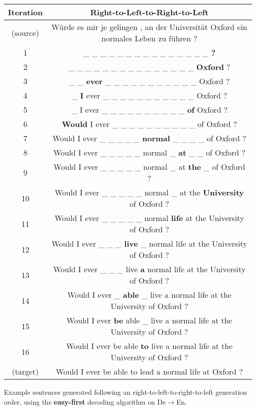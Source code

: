 \centering
\footnotesize
\begin{tabular}{cc}
\toprule
Iteration & {\color{orange} Right-to-Left-to-Right-to-Left} \\
\midrule
(source) & Würde es mir je gelingen , an der Universität Oxford ein normales Leben zu führen ? \\
1 &  \_ \_ \_ \_ \_ \_ \_ \_ \_ \_ \_ \_ \_ \_ \_ \textbf{?} \\ 
2 &  \_ \_ \_ \_ \_ \_ \_ \_ \_ \_ \_ \_ \_ \_ \_ \textbf{Oxford} ? \\ 
3 &  \_ \_ \textbf{ever} \_ \_ \_ \_ \_ \_ \_ \_ \_ \_ \_ Oxford ? \\ 
4 &  \_ \textbf{I} ever \_ \_ \_ \_ \_ \_ \_ \_ \_ \_ \_ Oxford ? \\ 
5 &  \_ I ever \_ \_ \_ \_ \_ \_ \_ \_ \_ \_ \textbf{of} Oxford ? \\ 
6 &  \textbf{Would} I ever \_ \_ \_ \_ \_ \_ \_ \_ \_ \_ of Oxford ? \\ 
7 &  Would I ever \_ \_ \_ \_ \_ \textbf{normal} \_ \_ \_ \_ of Oxford ? \\ 
8 & Would I ever \_ \_ \_ \_ \_ normal \_ \textbf{at} \_ \_ of Oxford ? \\
9 & Would I ever \_ \_ \_ \_ \_ normal \_ at \textbf{the} \_ of Oxford ? \\
10 & Would I ever \_ \_ \_ \_ \_ normal \_ at the \textbf{University} of Oxford ? \\
11 & Would I ever \_ \_ \_ \_ \_ normal \textbf{life} at the University of Oxford ? \\
12 & Would I ever \_ \_ \_ \textbf{live} \_ normal life at the University of Oxford ? \\
13 & Would I ever \_ \_ \_ live \textbf{a} normal life at the University of Oxford ? \\
14 & Would I ever \_ \textbf{able} \_ live a normal life at the University of Oxford ? \\
15 & Would I ever \textbf{be} able \_ live a normal life at the University of Oxford ? \\
16 & Would I ever be able \textbf{to} live a normal life at the University of Oxford ? \\
(target) & Would I ever be able to lead a normal life at Oxford ? \\

\bottomrule
\end{tabular}

\caption{Example sentences generated following an {\color{orange} right-to-left-to-right-to-left} generation order, using the \textbf{easy-first} decoding algorithm on De$\rightarrow$En.}